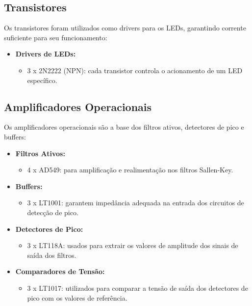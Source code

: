 \documentclass[a4paper, 12pt]{article}
\begin{document}
\subsection{Transistores}

Os transistores foram utilizados como drivers para os LEDs, garantindo corrente suficiente para seu funcionamento:

\begin{itemize}
    \item \textbf{Drivers de LEDs:}
    \begin{itemize}
        \item 3 x 2N2222 (NPN): cada transistor controla o acionamento de um LED específico.
    \end{itemize}
\end{itemize}

\subsection{Amplificadores Operacionais}

Os amplificadores operacionais são a base dos filtros ativos, detectores de pico e buffers:

\begin{itemize}
    \item \textbf{Filtros Ativos:}
    \begin{itemize}
        \item 4 x AD549: para amplificação e realimentação nos filtros Sallen-Key.
    \end{itemize}
    
    \item \textbf{Buffers:}
    \begin{itemize}
        \item 3 x LT1001: garantem impedância adequada na entrada dos circuitos de detecção de pico.
    \end{itemize}
    
    \item \textbf{Detectores de Pico:}
    \begin{itemize}
        \item 3 x LT118A: usados para extrair os valores de amplitude dos sinais de saída dos filtros.
    \end{itemize}
    
    \item \textbf{Comparadores de Tensão:}
    \begin{itemize}
        \item 3 x LT1017: utilizados para comparar a tensão de saída dos detectores de pico com os valores de referência.
    \end{itemize}
\end{itemize}
\end{document}
